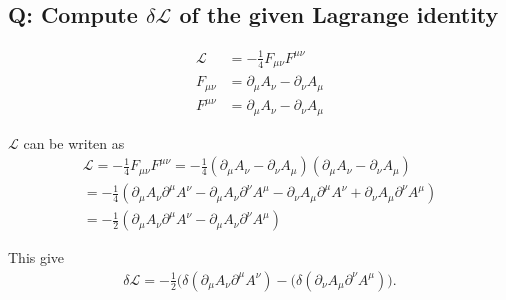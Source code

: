 \subsection{Q: Compute $\delta\mathcal{L}$ of the given Lagrange identity}

\begin{align}  
\mathcal{L} &= -\frac{1}{4}F_{\mu\nu}F^{\mu\nu} 
\label{eq:lagrange}\\
F_{\mu\nu} &= \partial_{\mu}A_{\nu}-\partial_{\nu}A_{\mu}\\
F^{\mu\nu} &= \partial_{\mu}A_{\nu}-\partial_{\nu}A_{\mu} \label{eq:F-tensor}
\end{align}

$\mathcal{L} $ can be writen as 
\begin{gather*}
\mathcal{L}=-\frac{1}{4}F_{\mu\nu}F^{\mu\nu}=-\frac{1}{4}(\partial_{\mu}A_{\nu}-\partial_{\nu}A_{\mu})(\partial_{\mu}A_{\nu}-\partial_{\nu}A_{\mu})\\=
-\frac{1}{4}(\partial_\mu A_\nu \partial^\mu A^\nu-\partial_\mu A_\nu \partial^\nu A^\mu-\partial_\nu A_\mu \partial^\mu A^\nu+\partial_\nu A_\mu \partial^\nu A^\mu)\\=
-\frac{1}{2}(\partial_\mu A_\nu \partial^\mu A^\nu-\partial_\mu A_\nu \partial^\nu A^\mu)
\end{gather*}


This give
\begin{gather*}
\delta \mathcal{L}=-\frac{1}{2}\big(\delta(\partial_\mu A_\nu \partial^\mu A^\nu)-(\delta(\partial_\nu A_\mu \partial^\nu A^\mu) \big).
\label{eq:term}
\end{gather*}

